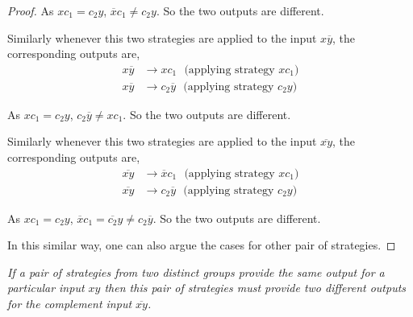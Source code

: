 \documentclass[]{svjour3}
\begin{document}
\begin{proof}
	As $xc_1=c_2y$, $\overline{x}c_1 \neq c_2y$. So the two outputs are different.
	
	Similarly whenever this two strategies are applied to the input $x\overline{y}$, the corresponding outputs are,
	\begin{align*}
	x\overline{y} &\rightarrow xc_1 ~~~\text{(applying strategy $xc_1$)}\\
	x\overline{y} &\rightarrow c_2\overline{y} ~~~\text{(applying strategy $c_2y$)}
	\end{align*}
	
	As $xc_1=c_2y$, $c_2\overline{y} \neq xc_1$. So the two outputs are different.
	
	Similarly whenever this two strategies are applied to the input $\overline{xy}$, the corresponding outputs are,
	\begin{align*}
	\overline{xy} &\rightarrow \overline{x}c_1 ~~~\text{(applying strategy $xc_1$)}\\
	\overline{xy} &\rightarrow c_2\overline{y} ~~~\text{(applying strategy $c_2y$)}
	\end{align*}
	
	As $xc_1=c_2y$, $\overline{x}c_1 = \overline{c_2}y \neq c_2\overline{y}$. So the two outputs are different.
	
	In this similar way, one can also argue the cases for other pair of strategies.
\end{proof}
\noindent

\begin{theorem}
	\label{thm4}
	{\it If a pair of strategies from two distinct groups provide the same output for a particular input $xy$ then this pair of strategies must provide two different outputs for the complement input $\overline{xy}$.}
\end{theorem}	
\end{document}
